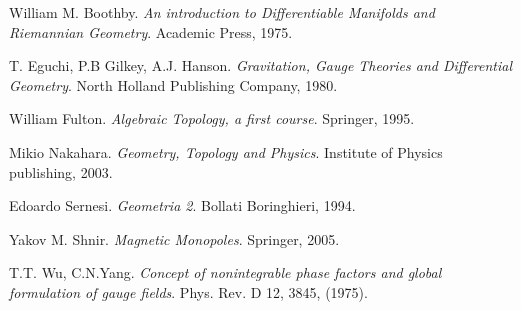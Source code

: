 \begin{thebibliography}{9}

William M. Boothby.
\textit{An introduction to Differentiable Manifolds and Riemannian Geometry}.
Academic Press, 1975.

T. Eguchi, P.B Gilkey, A.J. Hanson.
\textit{Gravitation, Gauge Theories and Differential Geometry}.
North Holland Publishing Company, 1980.

  William Fulton.
  \textit{Algebraic Topology, a first course}.
  Springer, 1995.

   Mikio Nakahara.
   \textit{Geometry, Topology and Physics}.
   Institute of Physics publishing, 2003.

   Edoardo Sernesi.
   \textit{Geometria 2}.
   Bollati Boringhieri, 1994.

  Yakov M. Shnir.
  \textit{Magnetic Monopoles}.
  Springer, 2005.

   T.T. Wu, C.N.Yang.
   \textit{Concept of nonintegrable phase factors and global formulation of gauge fields}.
   Phys. Rev. D 12, 3845, (1975).

%

\end{thebibliography}
